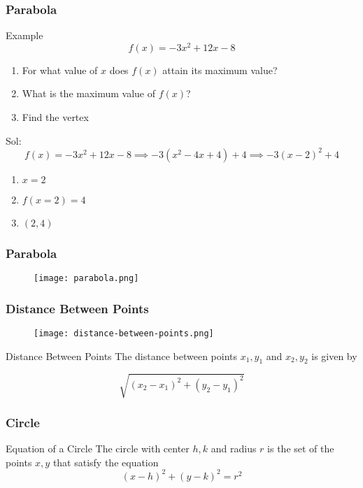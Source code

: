   
  \begin{frame}
    \frametitle{Parabola}
   \begin{exampleblock}{Example}
    \[f(x) = -3x^{2} + 12x - 8 \]
    \begin{enumerate}
      \item For what value of \(x\) does \(f (x) \) attain its maximum value?
      \item What is the maximum value of \(f (x)\)?
      \item Find the vertex 
    \end{enumerate}
   \end{exampleblock}
   Sol: \\ 
   \[f(x) = -3x^{2} + 12x - 8 \implies -3(x^{2} - 4x + 4) + 4 \implies -3(x-2)^{2} + 4 \]
   \begin{enumerate}
    \item \(x = 2\)
    \item \(f(x=2) = 4\)
    \item \( (2,4) \)
   \end{enumerate}
  \end{frame}
 \begin{frame}
  \frametitle{Parabola}
  \begin{figure}
    \centering
    \texttt{[image: parabola.png]}
  \end{figure}
 \end{frame}

 \begin{frame}
  \frametitle{Distance Between Points}
  \begin{figure}
    \centering
    \texttt{[image: distance-between-points.png]}
  \end{figure}
 \begin{alertblock}{Distance Between Points}
  The distance between points \(x_{1}, y_{1}\) and \(x_{2}, y_{2}\) is given by 
  
  \[\sqrt{ \left(x_{2} - x_{1} \right)^{2}  + \left( y_{2} - y_{1} \right)^{2} }\]
  
 \end{alertblock}
 \end{frame}

 \begin{frame}
  \frametitle{Circle}
  \begin{block}{Equation of a Circle}
    The circle with center \(h,k\) and radius \(r\) is the set of the points \(x,y\) that satisfy the equation
    \[\left(x-h\right)^{2} + \left(y-k\right)^{2} = r^{2}\] 
  \end{block}
 \end{frame}

